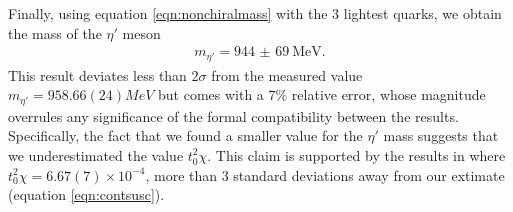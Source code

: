 Finally, using equation \ref{eqn:nonchiralmass} with the $3$ lightest quarks, we obtain the mass of the $\eta'$ meson
\begin{align}
  \label{eqn:metaprime}
  m_{\eta'} = \SI{944(69)}{\mega\electronvolt}.
\end{align}
This result deviates less than $2\sigma$ from the measured value $m_{\eta'}=958.66(24)\si{MeV}$ but comes with a $7\%$ relative error,
whose magnitude overrules any significance of the formal compatibility between the results.
Specifically, the fact that we found a smaller value for the $\eta'$ mass suggests that we underestimated the value $t_{0}^{2}\chi$.
This claim is supported by the results in \cite{Ce} where $t_{0}^{2}\chi = 6.67(7)\times 10^{-4}$, more than $3$ standard deviations away from
our extimate (equation \ref{eqn:contsusc}).
